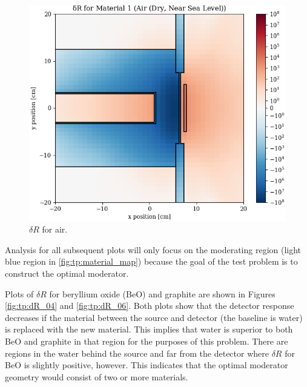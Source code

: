 \begin{figure}
\begin{minipage}{0.49\linewidth}
    \includegraphics[width=\linewidth]{content/testprob/dR_01.png}
    \caption{$\delta R$ for air.}
    \label{fig:tp:dR_01}
  \end{minipage}
\end{figure}

Analysis for all subsequent plots will only focus on the moderating region (light blue region in \ref{fig:tp:material_map}) because the goal of the test problem is to construct the optimal moderator.

Plots of $\delta R$ for beryllium oxide (BeO) and graphite are shown in Figures \ref{fig:tp:dR_04} and \ref{fig:tp:dR_06}.
Both plots show that the detector response decreases if the material between the source and detector (the baseline is water) is replaced with the new material.
This implies that water is superior to both BeO and graphite in that region for the purposes of this problem.
There are regions in the water behind the source and far from the detector where $\delta R$ for BeO is slightly positive, however.
This indicates that the optimal moderator geometry would consist of two or more materials.

